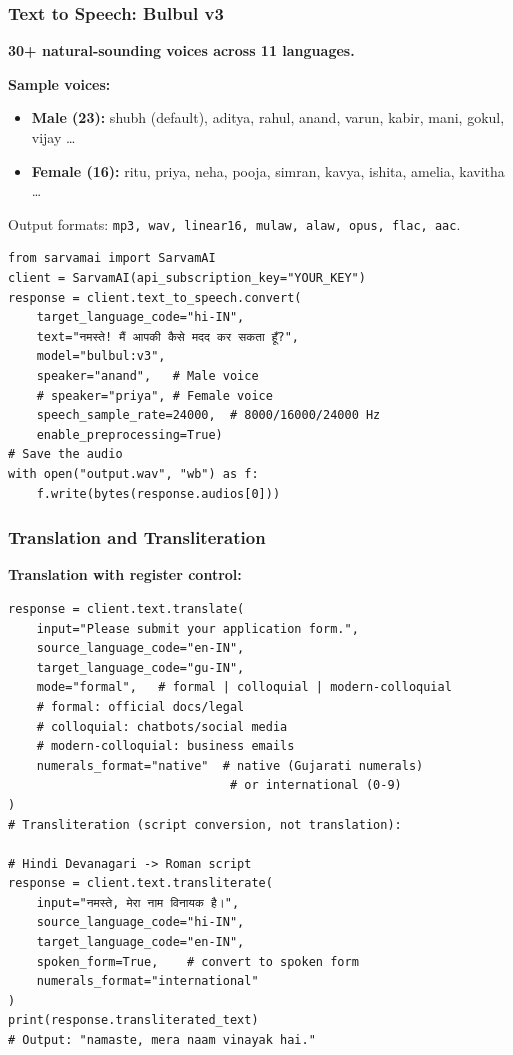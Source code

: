 \begin{frame}[fragile]\frametitle{Text to Speech: Bulbul v3}
\textbf{30+ natural-sounding voices across 11 languages.}

\textbf{Sample voices:}
\begin{itemize}
  \item \textbf{Male (23):} shubh (default), aditya, rahul, anand, varun, kabir, mani, gokul, vijay \ldots
  \item \textbf{Female (16):} ritu, priya, neha, pooja, simran, kavya, ishita, amelia, kavitha \ldots
\end{itemize}
Output formats: \texttt{mp3, wav, linear16, mulaw, alaw, opus, flac, aac}.


\begin{lstlisting}
from sarvamai import SarvamAI
client = SarvamAI(api_subscription_key="YOUR_KEY")
response = client.text_to_speech.convert(
    target_language_code="hi-IN",
    text="नमस्ते! मैं आपकी कैसे मदद कर सकता हूँ?",
    model="bulbul:v3",
    speaker="anand",   # Male voice
    # speaker="priya", # Female voice
    speech_sample_rate=24000,  # 8000/16000/24000 Hz
    enable_preprocessing=True)
# Save the audio
with open("output.wav", "wb") as f:
    f.write(bytes(response.audios[0]))
\end{lstlisting}


\end{frame}

\begin{frame}[fragile]\frametitle{Translation and Transliteration}
\textbf{Translation with register control:}
\begin{lstlisting}
response = client.text.translate(
    input="Please submit your application form.",
    source_language_code="en-IN",
    target_language_code="gu-IN",
    mode="formal",   # formal | colloquial | modern-colloquial
    # formal: official docs/legal
    # colloquial: chatbots/social media
    # modern-colloquial: business emails
    numerals_format="native"  # native (Gujarati numerals)
                               # or international (0-9)
)
# Transliteration (script conversion, not translation):

# Hindi Devanagari -> Roman script
response = client.text.transliterate(
    input="नमस्ते, मेरा नाम विनायक है।",
    source_language_code="hi-IN",
    target_language_code="en-IN",
    spoken_form=True,    # convert to spoken form
    numerals_format="international"
)
print(response.transliterated_text)
# Output: "namaste, mera naam vinayak hai."
\end{lstlisting}
\end{frame}

